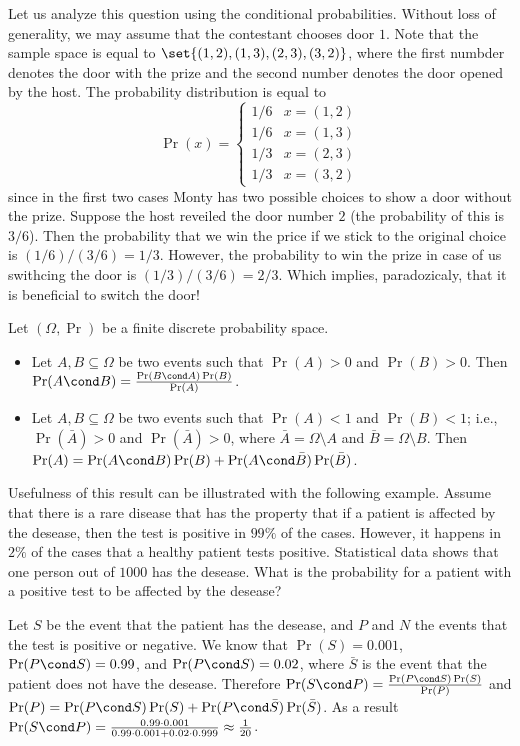 Let us analyze this question using the conditional probabilities. Without loss
of generality, we may assume that the contestant chooses door $1$.
Note that the sample space is equal to $\set{(1, 2), (1, 3), (2, 3), (3, 2)}$,
where the first numbder denotes the door with the prize and the second number
denotes the door opened by the host. The probability distribution is equal to 
\[
  \Pr(x) = 
  \begin{cases}
    1 / 6 & x = (1, 2) \\
    1 / 6 & x = (1, 3) \\
    1 / 3 & x = (2, 3) \\
    1 / 3 & x = (3, 2)
  \end{cases}
\]
since in the first two cases Monty has two possible choices to show a door
without the prize.
Suppose the host reveiled the door number $2$ (the probability of this is
$3 / 6$). Then the probability that we win the price if we stick to the original
choice is $(1 / 6) / (3 / 6) = 1 / 3$. However, the probability to win the prize
in case of us swithcing the door is $(1 / 3) / (3 / 6) = 2 / 3$. Which implies,
paradozicaly, that it is beneficial to switch the door!

\begin{theorem}
  Let $(\Omega, \Pr)$ be a finite discrete probability space. 
  \begin{itemize}
    \item Let $A, B \subseteq \Omega$ be two events such that $\Pr(A) > 0$ and
      $\Pr(B) > 0$. Then $\Pr(A \cond B) = \frac{\Pr(B \cond A) \Pr(B)}{\Pr(A)}$.
    \item Let $A, B \subseteq \Omega$ be two events such that $\Pr(A) < 1$ and
      $\Pr(B) < 1$; i.e., $\Pr(\bar{A}) > 0$ and $\Pr(\bar{A}) > 0$, where
      $\bar{A} = \Omega \setminus A$ and $\bar{B} = \Omega \setminus B$.
      Then $\Pr(A) = \Pr(A \cond B)\Pr(B) + \Pr(A \cond \bar{B})\Pr(\bar{B})$.
  \end{itemize}
\end{theorem}


Usefulness of this result can be illustrated with the following example. Assume
that there is a rare disease that has the property that if a patient is affected
by the desease, then the test is positive in $99\%$ of the cases. However, it
happens in $2\%$ of the cases that a healthy patient tests positive. Statistical
data shows that one person out of $1000$ has the desease. What is the
probability for a patient with a positive test to be affected by the desease?

Let $S$ be the event that the patient has the desease, and $P$ and $N$ the
events that the test is positive or negative. We know that $\Pr(S) = 0.001$,
$\Pr(P \cond S) = 0.99$, and $\Pr(P \cond S) = 0.02$, where $\bar{S}$ is the
event that the patient does not have the desease. Therefore $\Pr(S \cond P) =
\frac{\Pr(P \cond S) \Pr(S)}{\Pr(P)}$ and $\Pr(P) = \Pr(P \cond S) \Pr(S) +
\Pr(P \cond \bar{S}) \Pr(\bar{S})$. As a result $\Pr(S \cond P) = 
\frac{0.99 \cdot 0.001}{0.99 \cdot 0.001 + 0.02 \cdot 0.999} \approx
\frac{1}{20}$.
